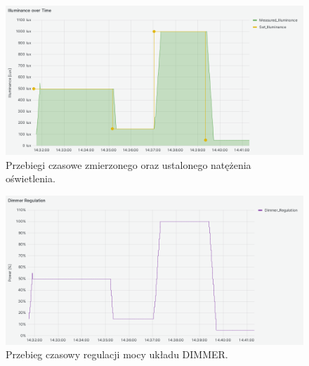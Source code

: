     \begin{figure}[H]
        \centering
        \includegraphics[width=0.8\linewidth]{graphics/grafana/illuminance-lm.png}
        \caption{Przebiegi czasowe zmierzonego oraz ustalonego natężenia oświetlenia.}
        \label{fig:graph-dimmer-illuminance}
    \end{figure}

    \begin{figure}[H]
        \centering
        \includegraphics[width=0.8\linewidth]{graphics/grafana/dimmer_regulation-lm.png}
        \caption{Przebieg czasowy regulacji mocy układu DIMMER.}
        \label{fig:graph-dimmer-regulation}
    \end{figure}